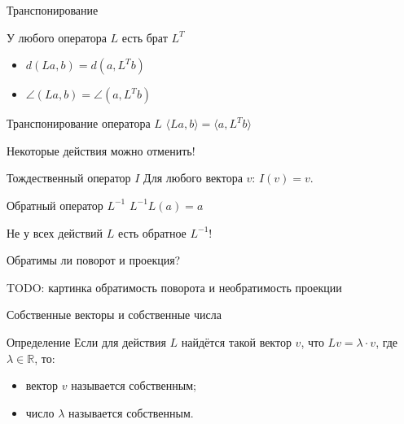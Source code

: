 \documentclass[14pt,xcolor=dvipsnames]{beamer}
\newcommand\R{\mathbb{R}}
\begin{document}
\begin{frame}{Транспонирование}

\begin{block}{У любого оператора $L$ есть брат $L^T$}
\begin{itemize}
  \item $d(La, b)=d(a, L^Tb)$
  \item $\angle(La, b) = \angle(a, L^Tb)$
\end{itemize}
\end{block}

\begin{block}{Транспонирование оператора $L$}
  $\langle La, b\rangle = \langle a, L^T b\rangle$
\end{block}

\end{frame}

\begin{frame}{Некоторые действия можно отменить!}

\begin{block}{Тождественный оператор $I$}
  Для любого вектора $v$: $I(v) = v$. 
\end{block}

\begin{block}{Обратный оператор $L^{-1}$}
  $L^{-1}L(a) = a$ 

Не у всех действий $L$ есть обратное $L^{-1}$!
\end{block}

\end{frame}
  

\begin{frame}{Обратимы ли поворот и проекция?}

\begin{block}{TODO: картинка обратимость поворота и необратимость проекции}
\end{block}

\end{frame}
  

\begin{frame}{Собственные векторы и собственные числа}

  
\begin{block}{Определение}
  Если для действия $L$ найдётся такой вектор $v$, что $Lv=\lambda \cdot v$, где $\lambda \in \R$, то:
  \begin{itemize}
    \item вектор $v$ называется собственным;
    \item число $\lambda$ называется собственным.
  \end{itemize} 
\end{block}
  
\end{frame}
\end{document}
